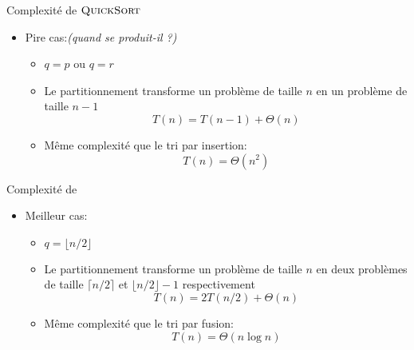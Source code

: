 \begin{frame}{Complexité de $\textnormal{\scshape QuickSort}$}

\begin{center}
\end{center}

\begin{itemize}
\item Pire cas:\hfill{\it (quand se produit-il ?)}

\begin{itemize}
\item $q=p$ ou $q=r$ 
\item Le partitionnement transforme un problème de taille $n$ en un problème de taille $n-1$
$$T(n)=T(n-1)+\Theta(n)$$
\item Même complexité que le tri par insertion:
$$T(n)=\Theta(n^2)$$
\end{itemize}
\end{itemize}
\end{frame}

\begin{frame}{Complexité de }

\begin{center}
\end{center}

\begin{itemize}
\item Meilleur cas:
\begin{itemize}
\item $q=\lfloor n/2 \rfloor$
\item Le partitionnement transforme un problème de taille $n$ en deux
  problèmes de taille $\lceil n/2\rceil$ et $\lfloor n/2 \rfloor-1$ respectivement
$$T(n)=2 T(n/2)+\Theta(n)$$

\item Même complexité que le tri par fusion:
$$T(n)=\Theta(n\log n)$$
\end{itemize}
\end{itemize}
\end{frame}

